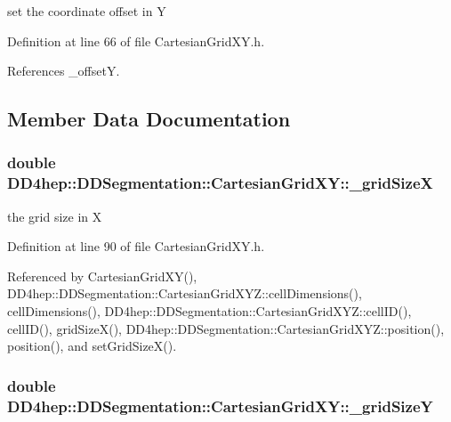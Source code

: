 set the coordinate offset in Y 

Definition at line 66 of file CartesianGridXY.h.

References \_\-offsetY.

\subsection{Member Data Documentation}
\hypertarget{class_d_d4hep_1_1_d_d_segmentation_1_1_cartesian_grid_x_y_a11329df4e58f1cb548bbd9f9f1108581}{
\subsubsection[{\_\-gridSizeX}]{\setlength{\rightskip}{0pt plus 5cm}double {\bf DD4hep::DDSegmentation::CartesianGridXY::\_\-gridSizeX}}}
\label{class_d_d4hep_1_1_d_d_segmentation_1_1_cartesian_grid_x_y_a11329df4e58f1cb548bbd9f9f1108581}


the grid size in X 

Definition at line 90 of file CartesianGridXY.h.

Referenced by CartesianGridXY(), DD4hep::DDSegmentation::CartesianGridXYZ::cellDimensions(), cellDimensions(), DD4hep::DDSegmentation::CartesianGridXYZ::cellID(), cellID(), gridSizeX(), DD4hep::DDSegmentation::CartesianGridXYZ::position(), position(), and setGridSizeX().\hypertarget{class_d_d4hep_1_1_d_d_segmentation_1_1_cartesian_grid_x_y_a63a6d16599e635a2046e144fb465e181}{
\subsubsection[{\_\-gridSizeY}]{\setlength{\rightskip}{0pt plus 5cm}double {\bf DD4hep::DDSegmentation::CartesianGridXY::\_\-gridSizeY}}}
\label{class_d_d4hep_1_1_d_d_segmentation_1_1_cartesian_grid_x_y_a63a6d16599e635a2046e144fb465e181}


